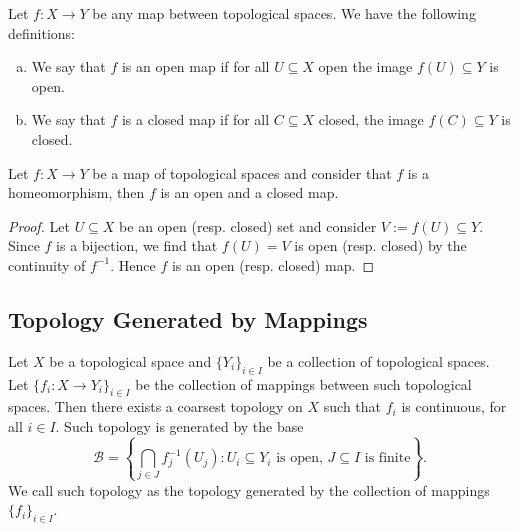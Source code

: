 \begin{definition}
  \label{def: open/closed maps}
  Let \(f : X \to Y\) be any map between topological spaces. We have the
  following definitions:
  \begin{enumerate}[(a)]
    \item We say that \(f\) is an open map if for all \(U \subseteq X\) open the
      image \(f(U) \subseteq Y\) is open.
    \item We say that \(f\) is a closed map if for all \(C \subseteq X\) closed,
      the image \(f(C) \subseteq Y\) is closed.
  \end{enumerate}
\end{definition}

\begin{proposition}
  Let \(f: X \to Y\) be a map of topological spaces and consider that \(f\) is a
  homeomorphism, then \(f\) is an open and a closed map.
\end{proposition}

\begin{proof}
  Let \(U \subseteq X\) be an open (resp. closed) set and consider \(V := f(U)
  \subseteq Y\).  Since \(f\) is a bijection, we find that \(f(U) = V\) is open
  (resp. closed) by the continuity of \(f^{-1}\). Hence \(f\) is an open (resp.
  closed) map.
\end{proof}

\subsection{Topology Generated by Mappings}

\begin{proposition}
  \label{prop: top generated by collection of maps}
  Let \(X\) be a topological space and \(\{Y_i\}_{i \in I}\) be a collection of
  topological spaces. Let \(\{f_i : X \to Y_i\}_{i \in I}\) be the collection of
  mappings between such topological spaces. Then there exists a coarsest
  topology on \(X\) such that \(f_i\) is continuous, for all \(i \in I\). Such
  topology is generated by the base
  \[
    \mathcal B = \left\{ \bigcap_{j \in J} f_j^{-1}(U_j) : U_i \subseteq Y_i
    \text{ is open, } J \subseteq I \text{ is finite}\right\}.
  \] 
  We call such topology as the topology generated by the collection of mappings
  \(\{f_i\}_{i \in I}\).
\end{proposition}

